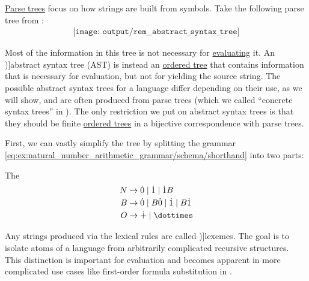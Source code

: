 \begin{concept}\label{con:abstract_syntax_tree}
  \hyperref[def:parse_tree]{Parse trees} focus on how strings are built from symbols. Take the following parse tree from :
  \begin{equation}\label{eq:con:abstract_syntax_tree/base}
    \begin{aligned}
      \texttt{[image: output/rem\_\_abstract\_syntax\_tree]}
    \end{aligned}
  \end{equation}

  Most of the information in this tree is not necessary for \hyperref[con:evaluation]{evaluating} it. An \term[en=abstract syntax tree (\cite[41]{Aho2006})]{abstract syntax tree} (AST) is instead an \hyperref[def:ordered_tree]{ordered tree} that contains information that is necessary for evaluation, but not for yielding the source string. The possible abstract syntax trees for a language differ depending on their use, as we will show, and are often produced from parse trees (which we called \enquote{concrete syntax trees} in ). The only restriction we put on abstract syntax trees is that they should be finite \hyperref[def:ordered_tree]{ordered trees} in a bijective correspondence with parse trees.

  First, we can vastly simplify the tree by splitting the grammar \eqref{eq:ex:natural_number_arithmetic_grammar/schema/shorthand} into two parts:
  \begin{thmenum}
     The 
    \begin{equation*}
      \begin{aligned}
        N &\to \syn0 \mid \syn1 \mid \syn1 B \\
        B &\to \syn0 \mid B \syn0 \mid \syn1 \mid B \syn1 \\
        O &\to \synplus \mid \syntimes
      \end{aligned}
    \end{equation*}

    Any strings produced via the lexical rules are called \term[ru=лексемы (\cite[329]{Гладкий1973Языки})]{lexemes}. The goal is to isolate atoms of a language from arbitrarily complicated recursive structures. This distinction is important for evaluation and becomes apparent in more complicated use cases like first-order formula substitution in .


\end{thmenum}
\end{concept}
